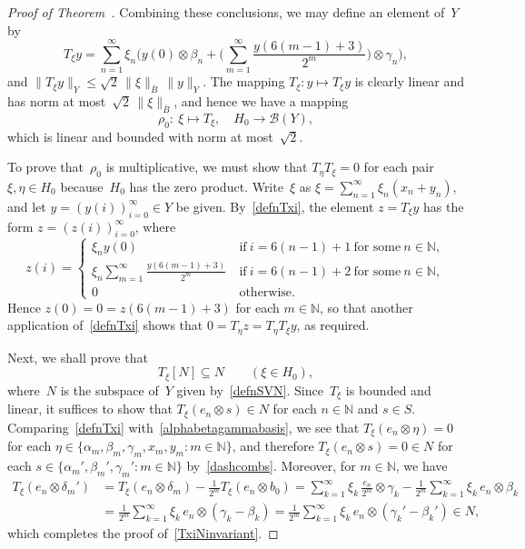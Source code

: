 \documentclass[12pt,reqno]{amsart}
\theoremstyle{definition}
\numberwithin{equation}{section}
\renewcommand{\le}{\ensuremath{\leqslant}}
\newcommand{\N}{\mathbb{N}}
\begin{document}
\begin{proof}[Proof of Theorem~{\normalfont{\ref{WEBEsplitexact}}}]
Combining these conclusions, we may define an element of~$Y$ by
\begin{equation}\label{defnTxi}
 T_\xi y = \sum_{n=1}^\infty\xi_n\biggl(y(0)\otimes\beta_n +
 \biggl(\sum_{m=1}^\infty\frac{y(6(m-1)+3)}{2^m}\biggr)\otimes\gamma_n\biggr),
\end{equation}
and $\|T_\xi y\|_Y\le\sqrt{2}\,\|\xi\|_{\overline{B}}\,\|y\|_Y$.  The
mapping $T_\xi\colon y\mapsto T_\xi y$ is clearly linear and has norm
at most~$\sqrt{2}\,\|\xi\|_{\overline{B}}$, and hence we have a
mapping \begin{equation}\label{defnrho0} \rho_0\colon\ \xi\mapsto
  T_\xi,\quad H_0\to\mathscr{B}(Y), \end{equation} which is linear and
bounded with norm at most~$\sqrt{2}$.  

To prove that~$\rho_0$ is multiplicative, we must show that $T_\eta
T_\xi = 0$ for each pair $\xi,\eta\in H_0$ because~$H_0$ has the zero
product. Write~$\xi$ as \mbox{$\xi =
  \sum_{n=1}^\infty\xi_n(x_n+y_n)$}, and let \mbox{$y =
  (y(i))_{i=0}^\infty\in Y$} be given. By~\eqref{defnTxi}, the element
$z = T_\xi y$ has the form $z = (z(i))_{i=0}^\infty$, where
\[ z(i) = \begin{cases} \xi_n y(0)\ &\text{if}\ i =
  6(n-1)+1\ \text{for
    some}\ n\in\N,\\ 
\displaystyle{\xi_n\sum_{m=1}^\infty\frac{y(6(m-1)+3)}{2^m}}\ &\text{if}\ i
  = 6(n-1)+2\ \text{for
    some}\ n\in\N,\\ 0\ &\text{otherwise.} \end{cases} \] Hence $z(0) = 0 = z(6(m-1)+3)$ for each
$m\in\N$, so that another application of~\eqref{defnTxi} shows that $0
= T_\eta z = T_\eta T_\xi y$, as required.

Next, we shall prove that  
\begin{equation}\label{TxiNinvariant}
T_\xi[N]\subseteq N\qquad (\xi\in H_0),
\end{equation}
where~$N$ is the subspace of~$Y$ given by~\eqref{defnSVN}.
Since~$T_\xi$ is bounded and linear, it suffices to show that
$T_\xi(e_n\otimes s)\in N$ for each $n\in\N$ and $s\in S$.
Comparing~\eqref{defnTxi} with~\eqref{alphabetagammabasis}, we see
that $T_\xi(e_n\otimes\eta) = 0$ for each $\eta\in\{\alpha_m, \beta_m,
\gamma_m, x_m, y_m:m\in\N\}$, and therefore $T_\xi(e_n\otimes s) =
0\in N$
for each $s\in\{\alpha_m',\beta_m',\gamma_m':m\in\N\}$
by~\eqref{dashcombs}. Moreover, for $m\in\N$, we have
\begin{align*} T_\xi(e_n\otimes\delta_m') &= T_\xi(e_n\otimes\delta_m) -
\frac{1}{2^m}T_\xi(e_n\otimes b_0) =
\sum_{k=1}^\infty\xi_k\,\frac{e_n}{2^m}\otimes\gamma_k -
\frac{1}{2^m}\sum_{k=1}^\infty\xi_k\, e_n\otimes\beta_k\\ &=
\frac{1}{2^m}\sum_{k=1}^\infty\xi_k\,e_n \otimes(\gamma_k - \beta_k) =
\frac{1}{2^m}\sum_{k=1}^\infty\xi_k\,e_n\otimes(\gamma_k' -
\beta_k')\in N, \end{align*} which completes the proof
of~\eqref{TxiNinvariant}.


\end{proof}
\end{document}
